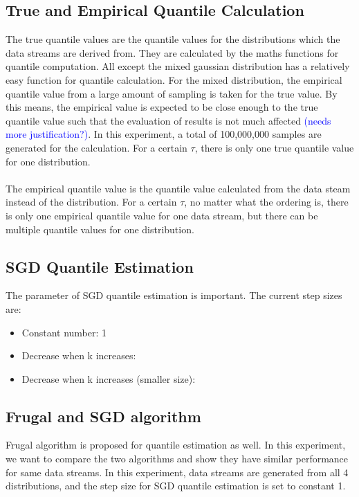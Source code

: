\documentclass[12pt]{article}
\begin{document}
\subsection{True and Empirical Quantile Calculation}
The true quantile values are the quantile values for the distributions which the data streams are derived from. They are calculated by the maths functions for quantile computation. All except the mixed gaussian distribution has a relatively easy function for quantile calculation. For the mixed distribution, the empirical quantile value from a large amount of sampling is taken for the true value. By this means, the empirical value is expected to be close enough to the true quantile value such that the evaluation of results is not much affected \textcolor{blue}{(needs more justification?)}. In this experiment, a total of 100,000,000 samples are generated for the calculation. For a certain $\tau$, there is only one true quantile value for one distribution.
\\\\
The empirical quantile value is the quantile value calculated from the data steam instead of the distribution. For a certain $\tau$, no matter what the ordering is, there is only one empirical quantile value for one data stream, but there can be multiple quantile values for one distribution.

\subsection{SGD Quantile Estimation}

The parameter of SGD quantile estimation is important. The current step sizes are:
\begin{itemize}
    \item Constant number: 1
    \item Decrease when k increases: 
    \item Decrease when k increases (smaller size):
\end{itemize}

\subsection{Frugal and SGD algorithm}

Frugal algorithm is proposed for quantile estimation as well. In this experiment, we want to compare the two algorithms and show they have similar performance for same data streams. In this experiment, data streams are generated from all 4 distributions, and the step size for SGD quantile estimation is set to constant 1.
\end{document}
